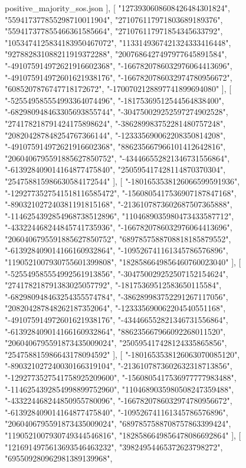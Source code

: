 \begin{filecontents*}[overwrite]{positive_majority_sos.json}
   ],
   [
    "1273930608608426484301824",
    "559417377855298710011904",
    "271076117971803689189376",
    "559417377855466361585664",
    "271076117971854345633792",
    "1053474125834183950467072",
    "1133149367421324333416448",
    "927882831088211919372288",
    "2007686427497977645891584",
    "-491075914972621916602368",
    "-1667820786032976064413696",
    "-491075914972601621938176",
    "-1667820786032974780956672",
    "6085207876747718172672",
    "-1700702128897741899694080"
   ],
   [
    "-525549585554993364074496",
    "-18175369512544564838400",
    "-682980948463305693855744",
    "-304750029252597274902528",
    "274178218791424175898624",
    "-386289983752281480757248",
    "208204287848254767366144",
    "-123335690062208350814208",
    "-491075914972621916602368",
    "886235667966101412642816",
    "2060406795591885627850752",
    "-434466552821346731556864",
    "-613928409014164877475840",
    "250595417428114870370304",
    "254758815986630584172544"
   ],
   [
    "-1801653538126066599591936",
    "-1292773527541518116585472",
    "-1560805417536907187847168",
    "-890321027240381191815168",
    "-2136107873602687507365888",
    "-1146254392854968738512896",
    "1104689035980473433587712",
    "-433224468244845741735936",
    "-1667820786032976064413696",
    "2060406795591885627850752",
    "6897857588708818185879552",
    "-613928409014166160932864",
    "-109526741161345786576896",
    "1190521007930755601399808",
    "1828586649856460760023040"
   ],
   [
    "-525549585554992561913856",
    "-304750029252507152154624",
    "274178218791383025057792",
    "-18175369512583650115584",
    "-682980948463254355574784",
    "-386289983752291267117056",
    "208204287848262187352064",
    "-123335690062204540551168",
    "-491075914972601621938176",
    "-434466552821346731556864",
    "-613928409014166160932864",
    "886235667966092268011520",
    "2060406795591873435009024",
    "250595417428124335865856",
    "254758815986643178094592"
   ],
   [
    "-1801653538126063070085120",
    "-890321027240030166319104",
    "-2136107873602632318713856",
    "-1292773527541758925209600",
    "-1560805417536977777983488",
    "-1146254392854998899752960",
    "1104689035980508247359488",
    "-433224468244850955780096",
    "-1667820786032974780956672",
    "-613928409014164877475840",
    "-109526741161345786576896",
    "2060406795591873435009024",
    "6897857588708757863399424",
    "1190521007930749344546816",
    "1828586649856478086692864"
   ],
   [
    "1216914975613693546463232",
    "39824954465372623798272",
    "695509280962981389139968",

\end{filecontents*}
